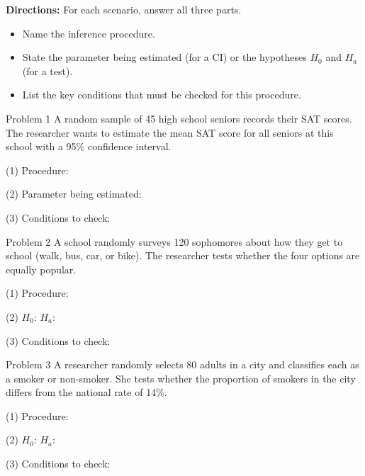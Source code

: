 \documentclass[10pt]{article}
\begin{document}
\namedateperiod

\vspace{0.1in}

\textbf{Directions:} For each scenario, answer all three parts.
\begin{itemize}[noitemsep]
  \item[(1)] Name the inference procedure.
  \item[(2)] State the parameter being estimated (for a CI) or the hypotheses $H_0$ and $H_a$ (for a test).
  \item[(3)] List the key conditions that must be checked for this procedure.
\end{itemize}

\begin{notesbox}{Problem 1}
A random sample of 45 high school seniors records their SAT scores. The researcher wants
to estimate the mean SAT score for all seniors at this school with a 95\% confidence interval.

\vspace{0.08in}
(1) Procedure: \blank{9cm}

\vspace{0.08in}
(2) Parameter being estimated: \writeline

\vspace{0.08in}
(3) Conditions to check: 
\end{notesbox}

\begin{notesbox}{Problem 2}
A school randomly surveys 120 sophomores about how they get to school (walk, bus, car, or
bike). The researcher tests whether the four options are equally popular.

\vspace{0.08in}
(1) Procedure: \blank{9cm}

\vspace{0.08in}
(2) $H_0$: \writeline
$H_a$: \writeline

\vspace{0.08in}
(3) Conditions to check: 
\end{notesbox}

\begin{notesbox}{Problem 3}
A researcher randomly selects 80 adults in a city and classifies each as a smoker or
non-smoker. She tests whether the proportion of smokers in the city differs from the
national rate of 14\%.

\vspace{0.08in}
(1) Procedure: \blank{9cm}

\vspace{0.08in}
(2) $H_0$: \writeline
$H_a$: \writeline

\vspace{0.08in}
(3) Conditions to check: 
\end{notesbox}
\end{document}
